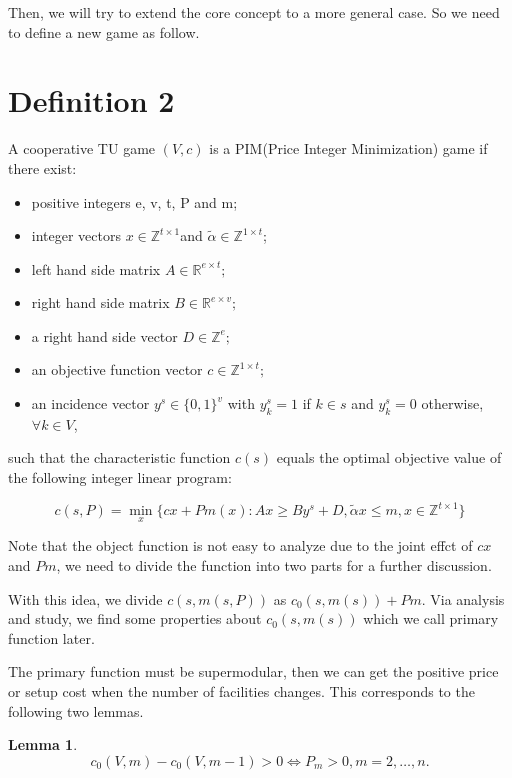 \documentclass[UTF8]{article}
\newtheorem{lem}{\hspace{2em}Lemma}
\begin{document}
Then, we will try to extend the core concept to a more general case. So we need to define a new game as follow.

\section*{Definition 2}

A cooperative TU game $(V,c)$ is a PIM(Price Integer Minimization) game if there exist:

\begin{itemize}
	\item positive integers e, v, t, P and m;
	\item integer vectors $ x \in \mathbb{Z}^{t \times 1} $and $ \tilde{\alpha} \in \mathbb{Z}^{1 \times t} $;
	\item left hand side matrix  $A \in \mathbb{R} ^{e \times t};$
	\item right hand side matrix $B \in \mathbb{R} ^ {e \times v};$
	\item a right hand side vector $D \in \mathbb{Z} ^ {e};$
	\item an objective function vector
	$c \in \mathbb{Z}^{1 \times t};$
	\item an incidence vector $y^s \in \{0,1\}^v$ with $y^s_k = 1$ if $k \in s$ and $y^s_k = 0 $ otherwise, $\forall k \in V$,

\end{itemize}

such that the characteristic function $c(s)$ equals the optimal objective value of the following integer linear program:

\[
c(s,P)= \mathop{\min}_{x} \{ cx+Pm(x): Ax \geq By^s+D, \tilde{\alpha}x \leq m, x \in \mathbb{Z}^{t \times 1} \}
\]

Note that the object function is not easy to analyze due to the joint effct of $cx$ and $Pm$, we need to divide the function into two parts for a further discussion.

With this idea, we divide $c(s,m(s,P))$ as $c_0(s,m(s))+Pm $. Via analysis and study, we find some properties about $c_0(s,m(s)) $ which we call primary function later.

The primary function must be supermodular, then we can get the positive price or setup cost when the number of facilities changes. This corresponds to the following two lemmas.


\begin{lem}\label{lem2}
\[c_0(V,m)- c_0(V,m-1) > 0 \Leftrightarrow P_m > 0, m=2,\ldots,n.\]

\end{lem}
\end{document}
